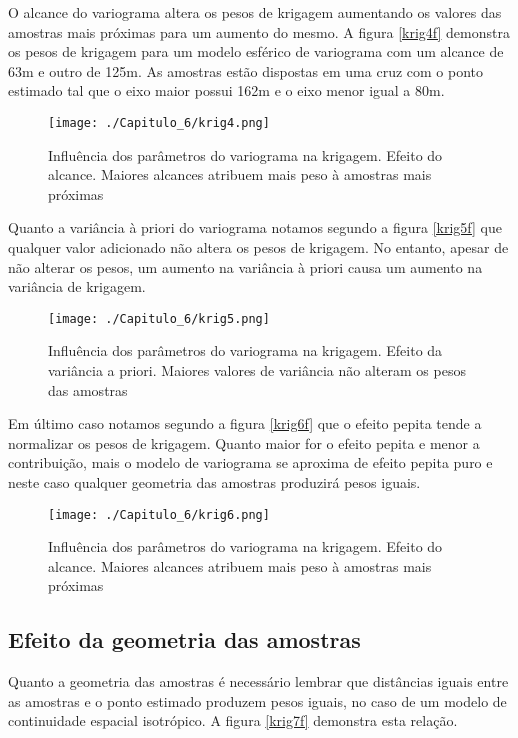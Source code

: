O alcance do variograma altera os pesos de krigagem aumentando os valores das amostras mais próximas para um aumento do mesmo. A figura \eqref{krig4f} demonstra os pesos de krigagem para um modelo esférico de variograma com um alcance de 63m e outro de 125m. As amostras estão dispostas em uma cruz com o ponto estimado tal que o eixo maior possui 162m e o eixo menor igual a 80m. 

\begin{figure}[H]
   	\centering
   	\texttt{[image: ./Capitulo\_6/krig4.png]}
   	\caption{Influência dos parâmetros do variograma na krigagem. Efeito do alcance. Maiores alcances atribuem mais peso à amostras mais próximas}
   	\label{krig4f}
\end{figure}

Quanto a variância à priori do variograma notamos segundo a figura \eqref{krig5f} que qualquer valor adicionado não altera os pesos de krigagem. No entanto, apesar de não alterar os pesos, um aumento na variância à priori causa um aumento na variância de krigagem. 

\begin{figure}[H]
  	\centering
  	\texttt{[image: ./Capitulo\_6/krig5.png]}
  	\caption{Influência dos parâmetros do variograma na krigagem. Efeito da variância a priori. Maiores valores de variância não alteram os pesos das amostras}
  	\label{krig5f}
\end{figure}

Em último caso notamos segundo a figura \eqref{krig6f} que o efeito pepita tende a normalizar os pesos de krigagem. Quanto maior for o efeito pepita e menor a contribuição, mais o modelo de variograma se aproxima de efeito pepita puro e neste caso qualquer geometria das amostras produzirá pesos iguais. 

\begin{figure}[H]
	\centering
	\texttt{[image: ./Capitulo\_6/krig6.png]}
	\caption{Influência dos parâmetros do variograma na krigagem. Efeito do alcance. Maiores alcances atribuem mais peso à amostras mais próximas}
	\label{krig6f}
\end{figure}

\subsection{Efeito da geometria das amostras}

Quanto a geometria das amostras é necessário lembrar que distâncias iguais entre as amostras e o ponto estimado produzem pesos iguais, no caso de um modelo de continuidade espacial isotrópico. A figura \eqref{krig7f} demonstra esta relação.

